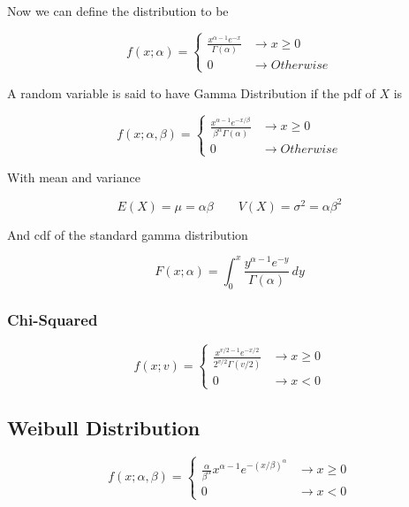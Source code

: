     Now we can define the distribution to be

        \[
            f(x; \alpha) =
            \begin{cases}
                \frac{x^{\alpha - 1}e^{-x} }{\Gamma(\alpha)} &\to x \ge 0\\
                0 &\to Otherwise
            \end{cases}
        \]

    A random variable is said to have Gamma Distribution if the pdf of $X$ is 

        \[
            f(x; \alpha, \beta) =
            \begin{cases}
                \frac{x^{\alpha - 1}e^{-x/\beta} }{\beta^\alpha \Gamma(\alpha)} &\to x \ge 0\\
                0 &\to Otherwise
            \end{cases}
        \]

    With mean and variance

        \[
            E(X) = \mu = \alpha \beta \qquad V(X) = \sigma^2 = \alpha \beta^2
        \]

    And cdf of the standard gamma distribution

        \[
            F(x;\alpha) =
            \int^x_0 \frac{y^{\alpha - 1}e^{-y} }{\Gamma(\alpha)} \, dy
        \]

        \subsubsection{Chi-Squared}
            \[
                f(x; v) = 
                \begin{cases}
                    \frac{x^{v/2 - 1}e^{-x/2} }{2^{v/2} \Gamma(v/2)} &\to x \ge 0\\
                    0 &\to x < 0
                \end{cases}
            \]

    \subsection{Weibull Distribution}
        \[
            f(x; \alpha, \beta) = 
            \begin{cases}
                \frac{\alpha}{\beta^\alpha} x^{\alpha - 1} e^{-(x/\beta)^\alpha} &\to x \ge 0\\
                0 &\to x < 0
            \end{cases}
        \]

